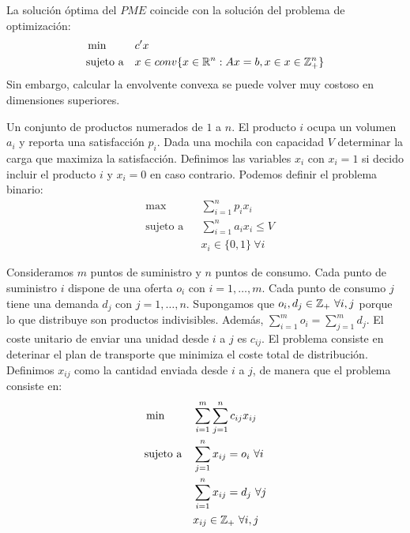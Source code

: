 \documentclass[PM.tex]{subfiles}
\begin{document}
\begin{obser}
La solución óptima del $PME$ coincide con la solución del problema de optimización:
\[
\begin{aligned}
& \min
& & c'x \\
& \text{sujeto a}
& & x \in conv\{x \in \mathbb{R}^n : Ax=b, x \in x \in \mathbb{Z}_+^n\}
\end{aligned}
\]
Sin embargo, calcular la envolvente convexa se puede volver muy costoso en dimensiones superiores.
\end{obser}

\begin{example}
Un conjunto de productos numerados de $1$ a $n$. El producto $i$ ocupa un volumen $a_i$ y reporta una satisfacción $p_i$. Dada una mochila con capacidad $V$ determinar la carga que maximiza la satisfacción. Definimos las variables $x_i$ con $x_i = 1$ si decido incluir el producto $i$ y $x_i = 0$ en caso contrario. Podemos definir el problema binario:
\[
\begin{aligned}
& \max
& & \sum_{i=1}^n p_i x_i \\
& \text{sujeto a}
& & \sum_{i=1}^n a_i x_i ≤ V\\
& & & x_i \in \{0,1\}\ \forall i 
\end{aligned}
\]
\end{example}

\begin{example}
Consideramos $m$ puntos de suministro y $n$ puntos de consumo. Cada punto de suministro $i$ dispone de una oferta $o_i$ con $i = 1,\dots,m$. Cada punto de consumo $j$ tiene una demanda $d_j$ con $j = 1,\dots,n$. Supongamos que $o_i,d_j \in \mathbb{Z}_+\ \forall i,j$ porque lo que distribuye son productos indivisibles. Además, $\sum_{i=1}^m o_i = \sum_{j=1}^m d_j$. El coste unitario de enviar una unidad desde $i$ a $j$ es $c_{ij}$. El problema consiste en deterinar el plan de transporte que minimiza el coste total de distribución. Definimos $x_{ij}$ como la cantidad enviada desde $i$ a $j$, de manera que el problema consiste en:
\[
\begin{aligned}
& \min
& & \sum_{i=1}^m \sum_{j=1}^n c_{ij}x_{ij} \\
& \text{sujeto a}
& & \sum_{j=1}^n x_{ij} = o_i \ \forall i\\
& & & \sum_{i=1}^n x_{ij} = d_j \ \forall j\\
& & & x_{ij} \in \mathbb{Z}_+ \ \forall i,j
\end{aligned}
\]
\end{example}
\end{document}
